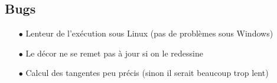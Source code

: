 \subsection{Bugs}
\begin{itemize}
\item[$\bullet$] Lenteur de l'exécution sous Linux (pas de problèmes sous Windows)
\item[$\bullet$] Le décor ne se remet pas à jour si on le redessine
\item[$\bullet$] Calcul des tangentes peu précis (sinon il serait beaucoup trop lent)
\end{itemize}
